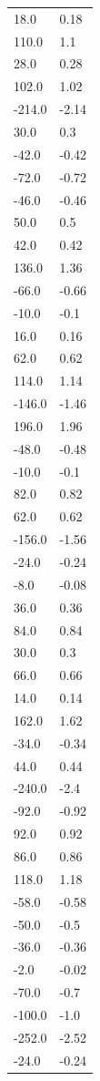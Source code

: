 \begin{longtable}{ll}
18.0 & 0.18 \\
110.0 & 1.1 \\
28.0 & 0.28 \\
102.0 & 1.02 \\
-214.0 & -2.14 \\
30.0 & 0.3 \\
-42.0 & -0.42 \\
-72.0 & -0.72 \\
-46.0 & -0.46 \\
50.0 & 0.5 \\
42.0 & 0.42 \\
136.0 & 1.36 \\
-66.0 & -0.66 \\
-10.0 & -0.1 \\
16.0 & 0.16 \\
62.0 & 0.62 \\
114.0 & 1.14 \\
-146.0 & -1.46 \\
196.0 & 1.96 \\
-48.0 & -0.48 \\
-10.0 & -0.1 \\
82.0 & 0.82 \\
62.0 & 0.62 \\
-156.0 & -1.56 \\
-24.0 & -0.24 \\
-8.0 & -0.08 \\
36.0 & 0.36 \\
84.0 & 0.84 \\
30.0 & 0.3 \\
66.0 & 0.66 \\
14.0 & 0.14 \\
162.0 & 1.62 \\
-34.0 & -0.34 \\
44.0 & 0.44 \\
-240.0 & -2.4 \\
-92.0 & -0.92 \\
92.0 & 0.92 \\
86.0 & 0.86 \\
118.0 & 1.18 \\
-58.0 & -0.58 \\
-50.0 & -0.5 \\
-36.0 & -0.36 \\
-2.0 & -0.02 \\
-70.0 & -0.7 \\
-100.0 & -1.0 \\
-252.0 & -2.52 \\
-24.0 & -0.24 \\

\end{longtable}
